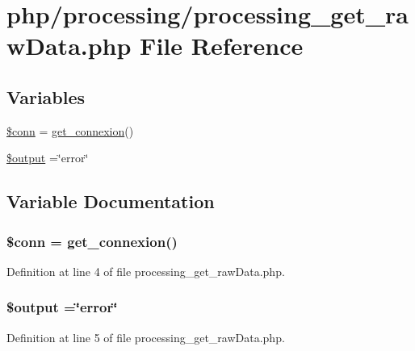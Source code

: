 \hypertarget{processing__get__raw_data_8php}{\section{php/processing/processing\-\_\-get\-\_\-raw\-Data.php File Reference}
\label{processing__get__raw_data_8php}
}
\subsection*{Variables}
\begin{DoxyCompactItemize}
\item 
\hyperlink{processing__get__raw_data_8php_aa8a5a87b9c1a6a0819b88447cbe41877}{\$conn} = \hyperlink{php__functions_8php_ace18bc10f3fd08f92688ac743e0d8c2e}{get\-\_\-connexion}()
\item 
\hyperlink{processing__get__raw_data_8php_a73004ce9cd673c1bfafd1dc351134797}{\$output} =\char`\"{}error\char`\"{}
\end{DoxyCompactItemize}


\subsection{Variable Documentation}
\hypertarget{processing__get__raw_data_8php_aa8a5a87b9c1a6a0819b88447cbe41877}{
\subsubsection[{\$conn}]{\setlength{\rightskip}{0pt plus 5cm}\$conn = {\bf get\-\_\-connexion}()}}\label{processing__get__raw_data_8php_aa8a5a87b9c1a6a0819b88447cbe41877}


Definition at line 4 of file processing\-\_\-get\-\_\-raw\-Data.\-php.

\hypertarget{processing__get__raw_data_8php_a73004ce9cd673c1bfafd1dc351134797}{
\subsubsection[{\$output}]{\setlength{\rightskip}{0pt plus 5cm}\$output =\char`\"{}error\char`\"{}}}\label{processing__get__raw_data_8php_a73004ce9cd673c1bfafd1dc351134797}


Definition at line 5 of file processing\-\_\-get\-\_\-raw\-Data.\-php.

